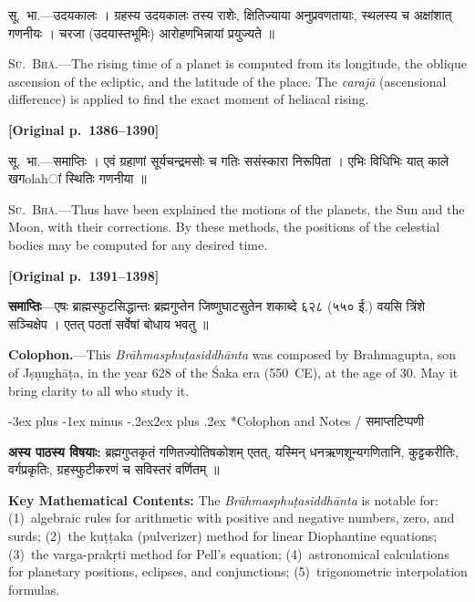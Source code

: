 \documentclass[11pt,a4paper]{article}
\makeatletter
\renewcommand{\section}{\@startsection {section}{1}{\z@}%
  {-3ex plus -1ex minus -.2ex}{2ex plus .2ex}%
  {\normalfont\Large\bfseries\color{sectioncolor}}}
\newcommand{\dev}[1]{{\devanagarifont\mdseries\upshape #1}}
\newcommand{\pagelabel}[1]{\textcolor{sectioncolor}{\textbf{[Original p.~#1]}}}
\newcommand{\bilingualpair}[2]{%
  \noindent%
  \begin{minipage}[t]{0.47\textwidth}
    \begin{flushleft}
      \small\dev{#1}
    \end{flushleft}
  \end{minipage}%
  \hfill\vrule\hfill%
  \begin{minipage}[t]{0.47\textwidth}
    \begin{flushleft}
      \small #2
    \end{flushleft}
  \end{minipage}%
  \par\vspace{1.2ex}
}
\makeatother
\begin{document}
\bilingualpair{%
सू.~भा.---उदयकालः । ग्रहस्य उदयकालः तस्य राशेः, क्षितिज्याया अनुप्रवणतायाः, स्थलस्य च अक्षांशात् गणनीयः । चरजा (उदयास्तभूमिः) आरोहणभिन्नायां प्रयुज्यते ॥
}{%
\textsc{Sū.~Bhā.}---The rising time of a planet is computed from its longitude, the oblique ascension of the ecliptic, and the latitude of the place. The \textit{carajā} (ascensional difference) is applied to find the exact moment of heliacal rising.
}

\vspace{0.5ex}
\pagelabel{1386--1390}

\bilingualpair{%
सू.~भा.---समाप्तिः । एवं ग्रहाणां सूर्यचन्द्रमसोः च गतिः ससंस्कारा निरूपिता । एभिः विधिभिः यात् काले खगolahां स्थितिः गणनीया ॥
}{%
\textsc{Sū.~Bhā.}---Thus have been explained the motions of the planets, the Sun and the Moon, with their corrections. By these methods, the positions of the celestial bodies may be computed for any desired time.
}

\vspace{0.5ex}
\pagelabel{1391--1398}

\bilingualpair{%
\textbf{समाप्तिः}---एषः ब्राह्मस्फुटसिद्धान्तः ब्रह्मगुप्तेन जिष्णुघाटसुतेन शकाब्दे ६२८ (५५० ई.) वयसि त्रिंशे सञ्चिक्षेप । एतत् पठतां सर्वेषां बोधाय भवतु ॥
}{%
\textbf{Colophon.}---This \textit{Brāhmasphuṭasiddhānta} was composed by Brahmagupta, son of Jṣṇughāṭa, in the year 628 of the Śaka era (550~CE), at the age of 30. May it bring clarity to all who study it.
}

\newpage

\section*{Colophon and Notes / \dev{समाप्तटिप्पणी}}

\bilingualpair{%
\textbf{अस्य पाठस्य विषयाः:} ब्रह्मगुप्तकृतं गणितज्योतिषकोशम् एतत्, यस्मिन् धनऋणशून्यगणितानि, कुट्टकरीतिः, वर्गप्रकृतिः, ग्रहस्फुटीकरणं च सविस्तरं वर्णितम् ॥
}{%
\textbf{Key Mathematical Contents:} The \textit{Brāhmasphuṭasiddhānta} is notable for: (1)~algebraic rules for arithmetic with positive and negative numbers, zero, and surds; (2)~the kuṭṭaka (pulverizer) method for linear Diophantine equations; (3)~the varga-prakṛti method for Pell's equation; (4)~astronomical calculations for planetary positions, eclipses, and conjunctions; (5)~trigonometric interpolation formulas.
}
\end{document}
